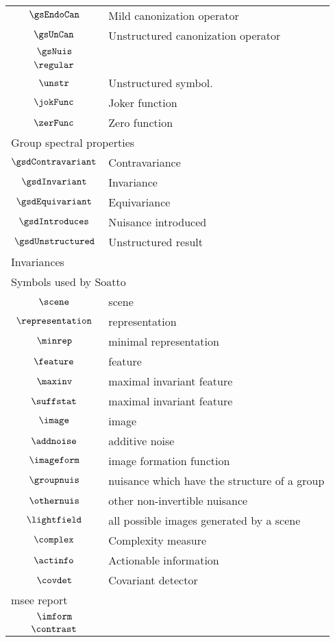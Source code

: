 \begin{longtable}{cl}
 $\gsEndoCan$ &  Mild canonization operator\\ 
 $\gsUnCan$ &  Unstructured canonization operator\\ 
 $\gsNuis$ &  \\ 
 $\regular$ & \\ 
 $\unstr$ &  Unstructured symbol.\\ 
 $\jokFunc$ &  Joker function\\ 
 $\zerFunc$ &  Zero function\\ 
 \multicolumn{2}{l}{Group spectral properties}\\ 
 \hline
$\gsdContravariant$ &  Contravariance\\ 
 $\gsdInvariant$ &  Invariance\\ 
 $\gsdEquivariant$ &  Equivariance\\ 
 $\gsdIntroduces$ &  Nuisance introduced\\ 
 $\gsdUnstructured$ &  Unstructured result\\ 
 \multicolumn{2}{l}{Invariances}\\ 
 \hline
\multicolumn{2}{l}{Symbols used by Soatto}\\ 
 \hline
$\scene$ &  scene\\ 
 $\representation$ &  representation\\ 
 $\minrep$ &  minimal representation\\ 
 $\feature$ &  feature\\ 
 $\maxinv$ &  maximal invariant feature\\ 
 $\suffstat$ &  maximal invariant feature\\ 
 $\image$ &  image\\ 
 $\addnoise$ &  additive noise\\ 
 $\imageform$ &  image formation function\\ 
 $\groupnuis$ &  nuisance which have the structure of a group\\ 
 $\othernuis$ &  other non-invertible nuisance\\ 
 $\lightfield$ &  all possible images generated by a scene\\ 
 $\complex$ &  Complexity measure\\ 
 $\actinfo$ &  Actionable information\\ 
 $\covdet$ &  Covariant detector\\ 
 \multicolumn{2}{l}{msee report}\\ 
 \hline
$\imform$ & \\ 
 $\contrast$ & \\ 

\end{longtable}
